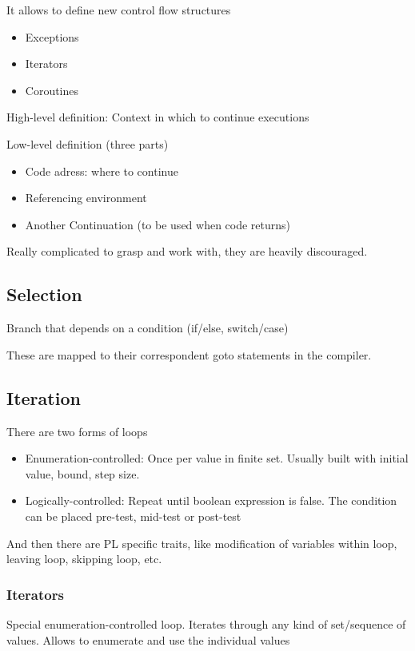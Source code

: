 \documentclass{article}
\begin{document}
It allows to define new control flow structures
\begin{itemize}
  \item Exceptions
  \item Iterators
  \item Coroutines
\end{itemize}

High-level definition: Context in which to continue executions

Low-level definition (three parts)
\begin{itemize}
  \item Code adress: where to continue
  \item Referencing environment
  \item Another Continuation (to be used when code returns)
\end{itemize}

Really complicated to grasp and work with, they are heavily discouraged.

\subsection{Selection}
Branch that depends on a condition (if/else, switch/case)

These are mapped to their correspondent goto statements in the compiler.

\subsection{Iteration}
There are two forms of loops
\begin{itemize}
  \item Enumeration-controlled: Once per value in finite set. Usually built with initial value, bound, step size.
  \item Logically-controlled: Repeat until boolean expression is false. The condition can be placed pre-test, mid-test or post-test
\end{itemize}
And then there are PL specific traits, like modification of variables within loop, leaving loop, skipping loop, etc.

\subsubsection{Iterators}
Special enumeration-controlled loop. Iterates through any kind of set/sequence of values. Allows to enumerate and use the individual values
\end{document}
